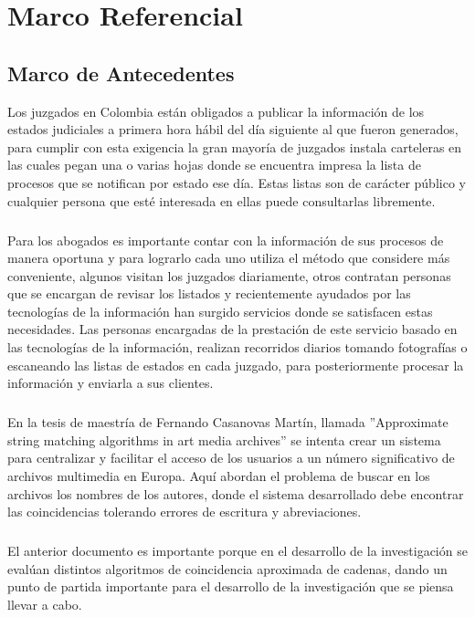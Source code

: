 \chapter{Marco Referencial}
\label{sec:marco}

\section{Marco de Antecedentes}
Los juzgados en Colombia est\'an obligados a publicar la informaci\'on de 
los estados judiciales a primera hora h\'abil del d\'ia siguiente al que 
fueron generados, para cumplir con esta exigencia la gran mayor\'ia de 
juzgados instala carteleras en las cuales pegan una o varias hojas 
donde se encuentra impresa la lista de procesos que se notifican por 
estado ese d\'ia. Estas listas son de car\'acter p\'ublico y cualquier persona
que est\'e interesada en ellas puede consultarlas libremente.
\paragraph{}
Para los abogados es importante contar con la informaci\'on de sus 
procesos de manera oportuna y para lograrlo cada uno utiliza el m\'etodo 
que considere m\'as conveniente, algunos visitan los juzgados diariamente,
otros contratan personas que se encargan de revisar los listados y 
recientemente ayudados por las tecnolog\'ias de la informaci\'on han surgido
servicios donde se satisfacen estas necesidades. Las personas encargadas
de la prestaci\'on de este servicio basado en las tecnolog\'ias de la 
informaci\'on, realizan recorridos diarios tomando fotograf\'ias o escaneando
las listas de estados en cada juzgado, para posteriormente procesar la 
informaci\'on y enviarla a sus clientes.
\paragraph{}
En la tesis de maestr\'ia de Fernando Casanovas Mart\'in, llamada 
''Approximate string matching algorithms in art media archives'' se 
intenta crear un sistema para centralizar y facilitar el acceso de los 
usuarios a un n\'umero significativo de archivos multimedia en Europa. 
Aqu\'i abordan el problema de buscar en los archivos los nombres de los 
autores, donde el sistema desarrollado debe encontrar las coincidencias
tolerando errores de escritura y abreviaciones.
\paragraph{}
El anterior documento es importante porque en el desarrollo de la 
investigaci\'on se eval\'uan distintos algoritmos de coincidencia aproximada
de cadenas, dando un punto de partida importante para el desarrollo de 
la investigaci\'on que se piensa llevar a cabo.
